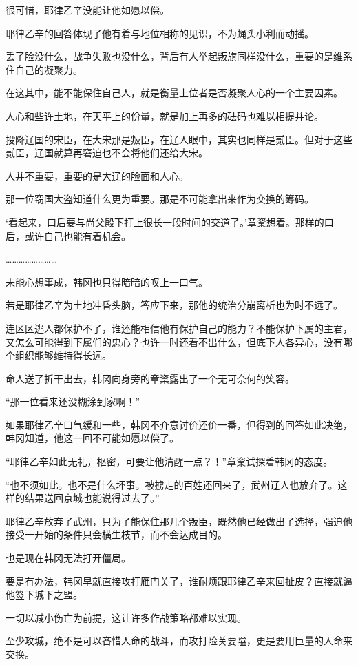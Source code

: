 很可惜，耶律乙辛没能让他如愿以偿。

耶律乙辛的回答体现了他有着与地位相称的见识，不为蝇头小利而动摇。

丢了脸没什么，战争失败也没什么，背后有人举起叛旗同样没什么，重要的是维系住自己的凝聚力。

在这其中，能不能保住自己人，就是衡量上位者是否凝聚人心的一个主要因素。

人心和些许土地，在天平上的份量，就是加上再多的砝码也难以相提并论。

投降辽国的宋臣，在大宋那是叛臣，在辽人眼中，其实也同样是贰臣。但对于这些贰臣，辽国就算再窘迫也不会将他们还给大宋。

人并不重要，重要的是大辽的脸面和人心。

那一位窃国大盗知道什么更为重要。那是不可能拿出来作为交换的筹码。

‘看起来，曰后要与尚父殿下打上很长一段时间的交道了。’章楶想着。那样的曰后，或许自己也能有着机会。

……………………

未能心想事成，韩冈也只得暗暗的叹上一口气。

若是耶律乙辛为土地冲昏头脑，答应下来，那他的统治分崩离析也为时不远了。

连区区逃人都保护不了，谁还能相信他有保护自己的能力？不能保护下属的主君，又怎么可能得到下属们的忠心？也许一时还看不出什么，但底下人各异心，没有哪个组织能够维持得长远。

命人送了折干出去，韩冈向身旁的章楶露出了一个无可奈何的笑容。

“那一位看来还没糊涂到家啊！”

如果耶律乙辛口气缓和一些，韩冈不介意讨价还价一番，但得到的回答如此决绝，韩冈知道，他这一回不可能如愿以偿了。

“耶律乙辛如此无礼，枢密，可要让他清醒一点？！”章楶试探着韩冈的态度。

“也不须如此。也不是什么坏事。被掳走的百姓还回来了，武州辽人也放弃了。这样的结果送回京城也能说得过去了。”

耶律乙辛放弃了武州，只为了能保住那几个叛臣，既然他已经做出了选择，强迫他接受一开始的条件只会横生枝节，而不会达成目的。

也是现在韩冈无法打开僵局。

要是有办法，韩冈早就直接攻打雁门关了，谁耐烦跟耶律乙辛来回扯皮？直接就逼他签下城下之盟。

一切以减小伤亡为前提，这让许多作战策略都难以实现。

至少攻城，绝不是可以吝惜人命的战斗，而攻打险关要隘，更是要用巨量的人命来交换。

